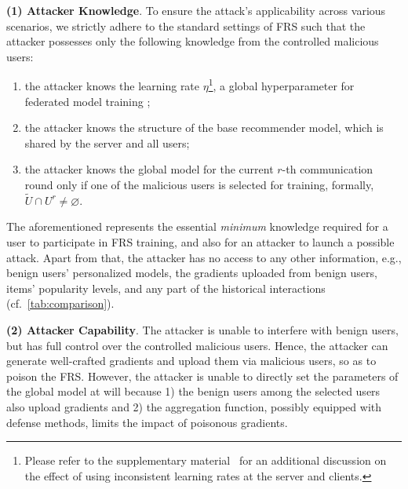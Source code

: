 \smallskip
\noindent\textbf{(1) Attacker Knowledge}.
To ensure the attack's applicability across various scenarios, we strictly adhere to the standard settings of FRS such that the attacker possesses only the following knowledge from the controlled malicious users:
\begin{enumerate}[leftmargin=*]
\item the attacker knows the learning rate $\eta$\footnote{Please refer to the supplementary material~\cite{github-pieck-supple} for an additional discussion on the effect of using inconsistent learning rates at the server and clients.}, a global hyperparameter for federated model training \cite{a-hum,fedrecattack,pipattack};
\item the attacker knows the structure of the base recommender model, which is shared by the server and all users;
\item the attacker knows the global model for the current $r$-th communication round only if one of the malicious users is selected for training, formally, $\tilde{{U}}\cap{U}^r\neq\mathcal{\varnothing}$.
\end{enumerate}
The aforementioned represents the essential \emph{minimum} knowledge required for a user to participate in FRS training, and also for an attacker to launch a possible attack.
Apart from that, the attacker has no access to any other information, e.g., benign users' personalized models, the gradients uploaded from benign users, items' popularity levels, and any part of the historical interactions (cf.\ \cref{tab:comparison}).

\smallskip
\noindent\textbf{(2) Attacker Capability}.
The attacker is unable to interfere with benign users, but has full control over the controlled malicious users. 
Hence, the attacker can generate well-crafted gradients and upload them via malicious users, so as to poison the FRS.
However, the attacker is unable to directly set the parameters of the global model at will because 1) the benign users among the selected users also upload gradients and 2) the aggregation function, possibly equipped with defense methods, limits the impact of poisonous gradients.


